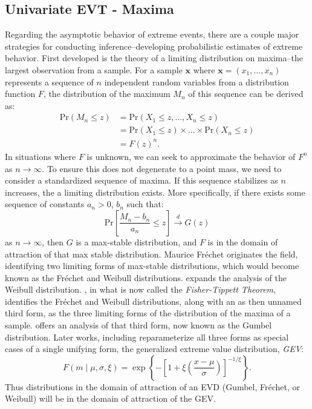 \subsection{Univariate EVT - Maxima}
Regarding the asymptotic behavior of extreme events, there are a couple major strategies for conducting
  inference--developing probabilistic estimates of extreme behavior.  First developed is the theory
  of a limiting distribution on maxima--the largest observation from a sample.  For a sample $\bm{x}$
  where $\bm{x} = (x_1,\ldots,x_n)$ represents a sequence of $n$ independent random variables from a
  distribution function $F$, the distribution of the maximum $M_n$ of this sequence can be derived
  as:
  \begin{equation*}
    \begin{aligned}
      \text{Pr}(M_n\leq z) &= \text{Pr}(X_1 \leq z, \ldots, X_n \leq z)\\
        &= \text{Pr}(X_1\leq z)\times\ldots\times\text{Pr}(X_n\leq z)\\
        &= F(z)^n.
    \end{aligned}
  \end{equation*}
  In situations where $F$ is unknown, we can seek to approximate the behavior of $F^n$ as
  $n\rightarrow\infty$.  To ensure this does not degenerate to a point mass, we need to consider a
  standardized sequence of maxima. If this sequence stabilizes as $n$ increases, the a limiting
  distribution exists.  More specifically, if there exists some sequence of constants $a_n > 0$, $b_n$
  such that:
  \begin{equation*}
    \text{Pr}\left[\frac{M_n - b_n}{a_n} \leq z\right] \stackrel{d}{\rightarrow} G(z)
  \end{equation*}
  as $n\rightarrow\infty$, then $G$ is a max-stable distribution, and $F$ is in the domain of
  attraction of that max stable distribution.  Maurice Fr{\'e}chet \cite{frechet1927} originates the
  field, identifying two limiting forms of max-stable distributions, which would become known as the
  Fr{\'e}chet and Weibull distributions. \cite{weibull1951} expands the analysis of the Weibull
  distribution.  \cite{fisher1928}, in what is now called the \emph{Fisher-Tippett Theorem}, identifies
  the Fr{\'e}chet and Weibull distributions, along with an as then unnamed third form, as the three
  limiting forms of the distribution of the maxima of a sample.  \cite{gumbel1935,gumbel1942} offers
   an analysis of that third form, now known as the Gumbel distribution.  Later works, including
   \cite{jenkinson1955} reparameterize all three forms as special cases of a single unifying form,
   the generalized extreme value distribution, \emph{GEV}:
  \begin{equation*}
    \label{eqn:gev}
    F(m \mid \mu, \sigma, \xi) = \exp\left\lbrace-\left[1 + \xi\left(\frac{x - \mu}{\sigma}\right)\right]_{}^{-1/{\xi}}\right\rbrace.
  \end{equation*}
  Thus distributions in the domain of attraction of an EVD (Gumbel, Fr{\'e}chet, or Weibull) will be
  in the domain of attraction of the GEV.

